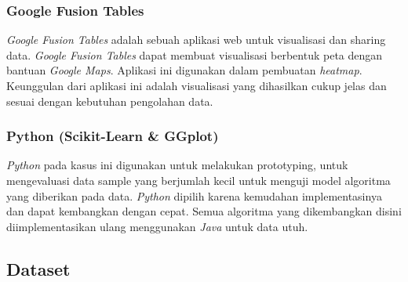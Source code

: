 \documentclass{article}
\begin{document}
\subsubsection{Google Fusion Tables}
\begin{adjustwidth}{4em}{0pt}
	
\hspace{\parindent}\textit{Google Fusion Tables} adalah sebuah aplikasi web untuk visualisasi dan sharing data. \textit{Google Fusion Tables} dapat membuat visualisasi berbentuk peta dengan bantuan \textit{Google Maps}. Aplikasi ini digunakan dalam pembuatan \textit{heatmap}. Keunggulan dari aplikasi ini adalah visualisasi yang dihasilkan cukup jelas dan sesuai dengan kebutuhan pengolahan data.

\end{adjustwidth}
\subsubsection{Python (Scikit-Learn \& GGplot)}
\begin{adjustwidth}{4em}{0pt}
		
\hspace{\parindent}\textit{Python} pada kasus ini digunakan untuk melakukan prototyping, untuk mengevaluasi data sample yang berjumlah kecil untuk menguji model algoritma yang diberikan pada data. \textit{Python} dipilih karena kemudahan implementasinya dan dapat kembangkan dengan cepat. Semua algoritma yang dikembangkan disini diimplementasikan ulang menggunakan \textit{Java} untuk data utuh.

\end{adjustwidth}

\subsection{Dataset}
\end{document}
